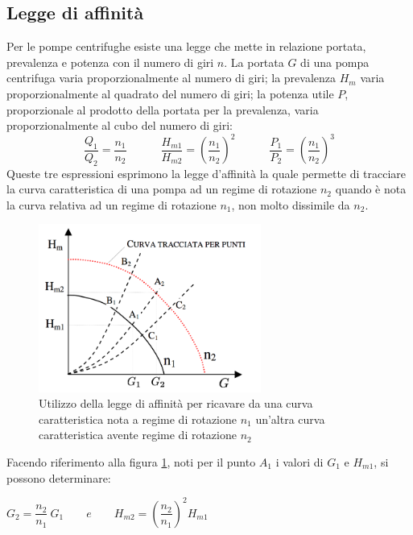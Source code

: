 \documentclass[laurea,oneside,11pt]{USiena_tesiLM}
\begin{document}
\subsection{Legge di affinità}
Per le pompe centrifughe esiste una legge che mette in relazione portata, prevalenza e potenza con il numero di giri $n$.
La portata $G$ di una pompa centrifuga varia proporzionalmente al numero di giri; la prevalenza $H_m$ varia proporzionalmente al quadrato del numero di giri; la potenza utile $P$, proporzionale al prodotto della portata per la prevalenza, varia proporzionalmente al cubo del numero di giri:
\begin{equation}
\frac{Q_1}{Q_2}=\frac{n_1}{n_2} \quad \qquad  \frac{H_{m1}}{H_{m2}}=\left( \frac{n_1}{n_2}\right)^2 \quad \qquad  \frac{P_1}{P_2}=\left( \frac{n_1}{n_2}\right)^3
\label{eq:affinita}
\end{equation}
Queste tre espressioni esprimono la legge d'affinità la quale permette di tracciare la curva caratteristica di una pompa ad un regime di rotazione $n_2$ quando è nota la curva relativa ad un regime di rotazione $n_1$, non molto dissimile da $n_2$.

\begin{figure}[!ht]
\centering
\includegraphics[width=0.65\textwidth]{figure/affinita} 
\caption{Utilizzo della legge di affinità per ricavare da una curva caratteristica nota a regime di rotazione $n_1$ un'altra curva caratteristica avente regime di rotazione $n_2$}
\label{fig:affinita}
\end{figure}

Facendo riferimento alla figura \ref{fig:affinita}, noti per il punto $A_1$ i valori di $G_1$ e $H_{m1}$, si possono determinare:

\begin{center}
$G_2 = \dfrac{n_2}{n_1} \ G_1 \qquad e \qquad H_{m2} = \left( \dfrac{n_2}{n_1}\right)^2  H_{m1}$
\end{center}
\end{document}
